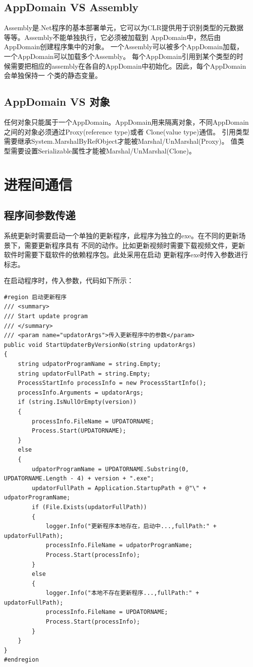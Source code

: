 \documentclass{book}
\begin{document}
\subsection{AppDomain VS Assembly}

Assembly是.Net程序的基本部署单元，它可以为CLR提供用于识别类型的元数据等等。Assembly不能单独执行，它必须被加载到
AppDomain中，然后由AppDomain创建程序集中的对象。
一个Assembly可以被多个AppDomain加载，一个AppDomain可以加载多个Assembly。
每个AppDomain引用到某个类型的时候需要把相应的assembly在各自的AppDomain中初始化。因此，每个AppDomain会单独保持一
个类的静态变量。

\subsection{AppDomain VS 对象}

任何对象只能属于一个AppDomain。AppDomain用来隔离对象，不同AppDomain之间的对象必须通过Proxy(reference type)或者
Clone(value type)通信。
引用类型需要继承System.MarshalByRefObject才能被Marshal/UnMarshal(Proxy)。
值类型需要设置Serializable属性才能被Marshal/UnMarshal(Clone)。

\section{进程间通信}

\subsection{程序间参数传递}
	
系统更新时需要启动一个单独的更新程序，此程序为独立的exe。在不同的更新场景下，需要更新程序具有
不同的动作。比如更新视频时需要下载视频文件，更新软件时需要下载软件的依赖程序包。此处采用在启动
更新程序exe时传入参数进行标志。

在启动程序时，传入参数，代码如下所示：
\begin{lstlisting}[language={[Sharp]C}]
#region 启动更新程序
/// <summary>
/// Start update program
/// </summary>
/// <param name="updatorArgs">传入更新程序中的参数</param>
public void StartUpdaterByVersionNo(string updatorArgs)
{
    string udpatorProgramName = string.Empty;
    string updatorFullPath = string.Empty;
    ProcessStartInfo processInfo = new ProcessStartInfo();
    processInfo.Arguments = updatorArgs;
    if (string.IsNullOrEmpty(version))
    {
        processInfo.FileName = UPDATORNAME;
        Process.Start(UPDATORNAME);
    }
    else
    {
        udpatorProgramName = UPDATORNAME.Substring(0, UPDATORNAME.Length - 4) + version + ".exe";
        updatorFullPath = Application.StartupPath + @"\" + udpatorProgramName;
        if (File.Exists(updatorFullPath))
        {
            logger.Info("更新程序本地存在，启动中...,fullPath:" + updatorFullPath);
            processInfo.FileName = udpatorProgramName;
            Process.Start(processInfo);
        }
        else
        {
            logger.Info("本地不存在更新程序...,fullPath:" + updatorFullPath);
            processInfo.FileName = UPDATORNAME;
            Process.Start(processInfo);
        }
    }
}
#endregion
\end{lstlisting}
\end{document}
